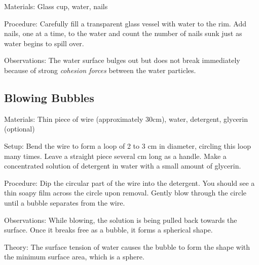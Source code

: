 \begin{multicols}{2}
\begin{description*}
\item[Materials:]{Glass cup, water, nails}
\item[Procedure:]{Carefully fill a transparent glass vessel with water to the rim. Add nails, one at a time, to
the water and count the number of nails sunk just as water begins to spill over.}
\item[Observations:]{The water surface bulges out but does not break immediately because of strong \emph{cohesion
forces} between the water particles.}
\end{description*}

\subsection{Blowing Bubbles}
\begin{description*}
\item[Materials:]{Thin piece of wire (approximately 30cm), water, detergent, glycerin (optional)}
\item[Setup:]{Bend the wire to form a loop of 2 to 3 cm in diameter, circling this loop many times. Leave a straight piece several cm long as a handle. Make a concentrated solution of detergent in water with a small amount of glycerin.}
\item[Procedure:]{Dip the circular part of the wire into the detergent. You should see a thin soapy film across the circle upon removal. Gently blow through the circle until a bubble separates from the wire.}
\item[Observations:]{While blowing, the solution is being pulled back towards the surface. Once it breaks free as a bubble, it forms a spherical shape.}
\item[Theory:]{The surface tension of water causes the bubble to form the shape with the minimum surface area, which is a sphere.}
\end{description*}


\end{multicols}
